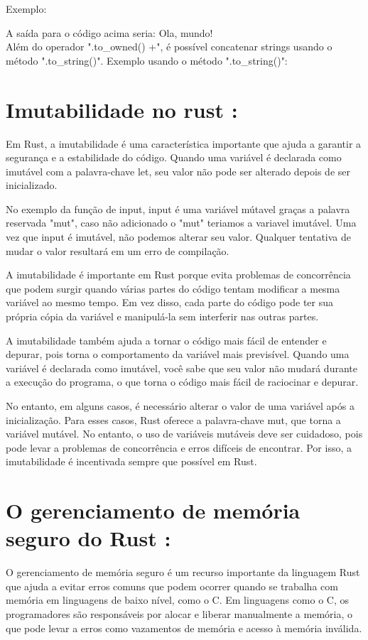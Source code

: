 \documentclass[12pt,a4paper,oneside]{abntex2}
\begin{document}
Exemplo:
%

A saída para o código acima seria:
Ola, mundo!\\

Além do operador ".to\_owned() +", é possível concatenar strings usando o método ".to\_string()". Exemplo usando o método ".to\_string()":

%


\section{Imutabilidade no rust :}
Em Rust, a imutabilidade é uma característica importante que ajuda a garantir a segurança e a estabilidade do código. Quando uma variável é declarada como imutável com a palavra-chave let, seu valor não pode ser alterado depois de ser inicializado. 

No exemplo da função de input, input é uma variável mútavel graças a palavra reservada "mut", caso não adicionado o "mut" teriamos a variavel imutável. Uma vez que input é imutável, não podemos alterar seu valor. Qualquer tentativa de mudar o valor resultará em um erro de compilação.

A imutabilidade é importante em Rust porque evita problemas de concorrência que podem surgir quando várias partes do código tentam modificar a mesma variável ao mesmo tempo. Em vez disso, cada parte do código pode ter sua própria cópia da variável e manipulá-la sem interferir nas outras partes.

A imutabilidade também ajuda a tornar o código mais fácil de entender e depurar, pois torna o comportamento da variável mais previsível. Quando uma variável é declarada como imutável, você sabe que seu valor não mudará durante a execução do programa, o que torna o código mais fácil de raciocinar e depurar.

No entanto, em alguns casos, é necessário alterar o valor de uma variável após a inicialização. Para esses casos, Rust oferece a palavra-chave mut, que torna a variável mutável. No entanto, o uso de variáveis mutáveis deve ser cuidadoso, pois pode levar a problemas de concorrência e erros difíceis de encontrar. Por isso, a imutabilidade é incentivada sempre que possível em Rust.
\section{O gerenciamento de memória seguro do Rust :} 
O gerenciamento de memória seguro é um recurso importante da linguagem Rust que ajuda a evitar erros comuns que podem ocorrer quando se trabalha com memória em linguagens de baixo nível, como o C. Em linguagens como o C, os programadores são responsáveis por alocar e liberar manualmente a memória, o que pode levar a erros como vazamentos de memória e acesso à memória inválida.
\end{document}
